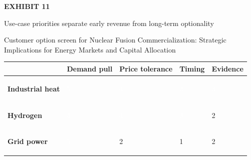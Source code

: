 \documentclass[10pt,a4paper]{article}
\begin{document}
\clearpage
{\textcolor{BOGreen}{\scriptsize\bfseries EXHIBIT 11}}\par\vspace{4pt}
{\sffamily\fontsize{17}{21}\selectfont\color{BONavy} Use-case priorities separate early revenue from long-term optionality}\par
{\small\color{BOText} Customer option screen for Nuclear Fusion Commercialization: Strategic Implications for Energy Markets and Capital Allocation}\par\vspace{6pt}
{\scriptsize\begin{tabular}{p{38mm}>{\centering\arraybackslash}p{21mm}>{\centering\arraybackslash}p{21mm}>{\centering\arraybackslash}p{21mm}>{\centering\arraybackslash}p{21mm}}
 & {\bfseries Demand pull} & {\bfseries Price tolerance} & {\bfseries Timing} & {\bfseries Evidence} \\
\hline
{\bfseries Industrial heat} & \colorbox{BOGreen}{\textcolor{white}{\strut\hspace{5pt}5\hspace{5pt}}} & \colorbox{BOGreen}{\textcolor{white}{\strut\hspace{5pt}4\hspace{5pt}}} & \colorbox{BOBlue}{\textcolor{white}{\strut\hspace{5pt}3\hspace{5pt}}} & \colorbox{BOBlue}{\textcolor{white}{\strut\hspace{5pt}3\hspace{5pt}}} \\
{\bfseries Hydrogen} & \colorbox{BOGreen}{\textcolor{white}{\strut\hspace{5pt}4\hspace{5pt}}} & \colorbox{BOGreen}{\textcolor{white}{\strut\hspace{5pt}4\hspace{5pt}}} & \colorbox{BOBlue}{\textcolor{white}{\strut\hspace{5pt}3\hspace{5pt}}} & \colorbox{BOLight}{\textcolor{BOText}{\strut\hspace{5pt}2\hspace{5pt}}} \\
{\bfseries Grid power} & \colorbox{BOGreen}{\textcolor{white}{\strut\hspace{5pt}5\hspace{5pt}}} & \colorbox{BOLight}{\textcolor{BOText}{\strut\hspace{5pt}2\hspace{5pt}}} & \colorbox{BOLight}{\textcolor{BOText}{\strut\hspace{5pt}1\hspace{5pt}}} & \colorbox{BOLight}{\textcolor{BOText}{\strut\hspace{5pt}2\hspace{5pt}}} \\

\end{tabular}}
\end{document}

